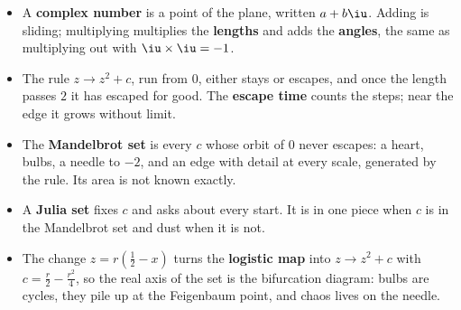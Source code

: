 \begin{summarybox}
\begin{itemize}
\item A \textbf{complex number} is a point of the plane, written $a +
  b\iu$. Adding is sliding; multiplying multiplies the \textbf{lengths} and
  adds the \textbf{angles}, the same as multiplying out with
  $\iu \times \iu = -1$.
\item The rule $z \to z^{2} + c$, run from $0$, either stays or escapes, and
  once the length passes $2$ it has escaped for good. The \textbf{escape
  time} counts the steps; near the edge it grows without limit.
\item The \textbf{Mandelbrot set} is every $c$ whose orbit of $0$ never
  escapes: a heart, bulbs, a needle to $-2$, and an edge with detail at
  every scale, generated by the rule. Its area is not known exactly.
\item A \textbf{Julia set} fixes $c$ and asks about every start. It is in
  one piece when $c$ is in the Mandelbrot set and dust when it is not.
\item The change $z = r(\tfrac12 - x)$ turns the \textbf{logistic map} into
  $z \to z^{2} + c$ with $c = \tfrac{r}{2} - \tfrac{r^{2}}{4}$, so the real
  axis of the set is the bifurcation diagram: bulbs are cycles, they pile up
  at the Feigenbaum point, and chaos lives on the needle.
\end{itemize}
\end{summarybox}

\canyou

